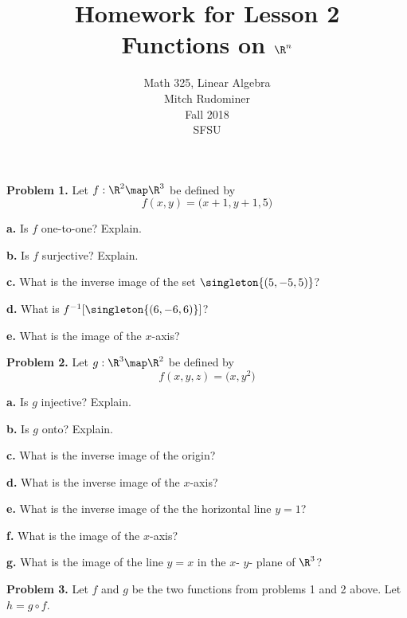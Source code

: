 \documentclass[oneside,12pt]{amsart}
\begin{document}
\title{Homework for Lesson 2 \\ Functions on $\R^n$}
\author{Math 325, Linear Algebra \\ Mitch Rudominer \\ Fall 2018 \\ SFSU }
\date{}

\maketitle


\textbf{Problem 1.} Let $f:\R^2\map\R^3$ be defined by
$$f(x,y) = \big(x+1, y+1,5 \big)$$

\textbf{a.} Is $f$ one-to-one? Explain.

\bigskip

\textbf{b.} Is $f$ surjective? Explain.

\bigskip

\textbf{c.} What is the inverse image of the set $\singleton{(5, -5, 5)}$?

\bigskip

\textbf{d.} What is $f^{-1}[\singleton{(6, -6, 6)}]$?

\bigskip

\textbf{e.} What is the image of the $x$-axis?

\bigskip

\textbf{Problem 2.} Let $g:\R^3\map\R^2$ be defined by
$$f(x,y,z) = \big(x, y^2 \big)$$

\textbf{a.} Is $g$ injective? Explain.

\bigskip

\textbf{b.} Is $g$ onto? Explain.

\bigskip

\textbf{c.} What is the inverse image of the origin?

\bigskip

\textbf{d.} What is the inverse image of the $x$-axis?

\bigskip

\textbf{e.} What is the inverse image of the the horizontal line $y=1$?

\bigskip

\textbf{f.} What is the image of the $x$-axis?

\bigskip

\textbf{g.} What is the image of the line $y=x$ in the $x$- $y$- plane
of $\R^3$?

\bigskip

\textbf{Problem 3.} Let $f$ and $g$ be the two functions from problems
1 and 2 above. Let $h = g \circ f$.
\end{document}
